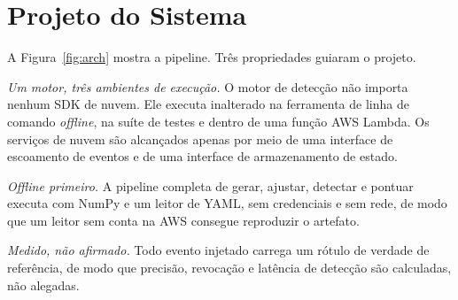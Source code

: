 \documentclass[conference]{IEEEtran}
\begin{document}
\section{Projeto do Sistema}
\label{sec:design}

A Figura~\ref{fig:arch} mostra a pipeline. Três propriedades guiaram o projeto.

\emph{Um motor, três ambientes de execução.} O motor de detecção não importa
nenhum SDK de nuvem. Ele executa inalterado na ferramenta de linha de comando
\emph{offline}, na suíte de testes e dentro de uma função AWS Lambda. Os
serviços de nuvem são alcançados apenas por meio de uma interface de escoamento
de eventos e de uma interface de armazenamento de estado.

\emph{\emph{Offline} primeiro.} A pipeline completa de gerar, ajustar,
detectar e pontuar executa com NumPy e um leitor de YAML, sem credenciais e sem
rede, de modo que um leitor sem conta na AWS consegue reproduzir o artefato.

\emph{Medido, não afirmado.} Todo evento injetado carrega um rótulo de verdade
de referência, de modo que precisão, revocação e latência de detecção são
calculadas, não alegadas.
\end{document}
